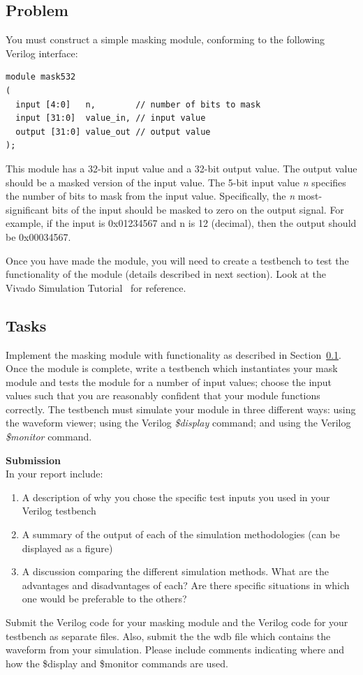 \documentclass{article}
\begin{document}
\subsection{Problem}
\label{sec:mask_prob}
You must construct a simple masking module, conforming to the following Verilog interface:

\begin{verbatim}
module mask532
(
  input [4:0]   n,        // number of bits to mask
  input [31:0]  value_in, // input value
  output [31:0] value_out // output value
);
\end{verbatim}

This module has a 32-bit input value and a 32-bit output value. The output value should be a masked version of the input value. The 5-bit input value \textit{n} specifies the number of bits to mask from the input value. Specifically, the \textit{n} most-significant bits of the input should be masked to zero on the output signal. For example, if the input is 0x01234567 and n is 12 (decimal), then the output should be 0x00034567.

Once you have made the module, you will need to create a testbench to test the functionality of the module (details described in next section). Look at the Vivado Simulation Tutorial~\cite{xilinxsimtut} for reference.

\subsection{Tasks}
Implement the masking module with functionality as described in Section~\ref{sec:mask_prob}. Once the module is complete, write a testbench which instantiates your mask module and tests the module for a number of input values; choose the input values such that you are reasonably confident that your module functions correctly. The testbench must simulate your module in three different ways: using the waveform viewer; using the Verilog \textit{\$display} command; and using the Verilog \textit{\$monitor} command.
\\

\begin{minipage}{\textwidth}
\noindent\textbf{Submission}\\
In your report include:
\begin{enumerate}
\item A description of why you chose the specific test inputs you used in your Verilog testbench
\item A summary of the output of each of the simulation methodologies (can be displayed as a figure)
\item A discussion comparing the different simulation methods. What are the advantages and disadvantages of each? Are there specific situations in which one would be preferable to the others?
\end{enumerate}
Submit the Verilog code for your masking module and the Verilog code for your testbench as separate files. Also, submit the the wdb file which contains the waveform from your simulation. Please include comments indicating where and how the \$display and \$monitor commands are used.
\end{minipage}
\end{document}
